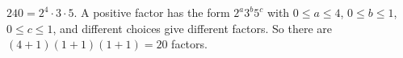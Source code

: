 $240=2^4\cdot3\cdot5$. A positive factor has the form $2^a3^b5^c$ with $0\le a\le4$, $0\le b\le1$, $0\le c\le1$, and different choices give different factors. So there are $(4+1)(1+1)(1+1)=\boxed{20}$ factors.
